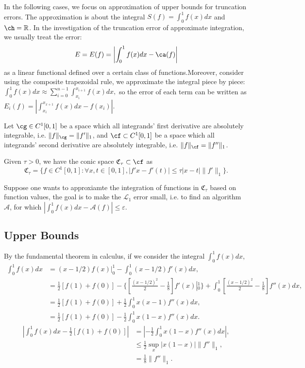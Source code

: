 
\newcommand{\R}{\mathbb{R}}
In the following cases, we focus on approximation of upper bounds for truncation errors. The approximation is about the integral $S(f)=\int_{0}^{1}f(x)dx$ and $\ch=\R$. In the investigation of the truncation error of approximate integration, we usually treat the error:
$$E=E(f)=\left|\int_{0}^{1}f(x)dx-\ca(f)\right|$$
as a linear functional defined over a certain class of functions.Moreover, consider using the composite trapezoidal rule, we approximate the integral piece by piece:
$\int_{0}^{1}f(x)dx\approx\sum_{i=0}^{n-1}\int_{x_{i}}^{x_{i+1}}f(x)dx,$ so the error of each term can be written as $E_i(f)=|\int_{x_{i}}^{x_{x+1}}f(x)dx-f(x_i)|$.

Let $\cg\in C^{1}[0,1]$ be a space which all integrands' first derivative are absolutely integrable, i.e. $\|f\|_{\cg}=\|f'\|_{1}$, and $\cf\subset C^{1}[0,1]$ be a space which all integrands' second derivative are absolutely integrable, i.e. $\|f\|_{\cf}=\|f''\|_{1}$.

Given $\tau > 0$, we have the conic space $\mathfrak{C}_{\tau} \subset \cf$ as $$\mathfrak{C}_{\tau}=\{f\in C^{1}[0,1]:\forall x,t \in[0,1], |f'{x}-f'(t)|\leq\tau|x-t|\|f'\|_1\}.$$

Suppose one wants to approxiamte the integration of functions in $\mathfrak{C}_{\tau}$ based on function values, the goal is to make the $\mathcal{L}_1$ error small, i.e. to find an algorithm $\mathcal{A}$, for which $|\int_{0}^{1}f(x)dx-\mathcal{A}(f)|\leq \varepsilon$.
\subsection{Upper Bounds}
By the fundamental theorem in calculus, if we consider the integral $\int_{0}^{1}f(x)dx$,
\begin{align*}
  \int_{0}^{1}f(x)dx&=(x-1/2)f(x)\left|\right._{0}^{1}-\int_{0}^{1}(x-1/2)f'(x)dx,\\
  &=\frac{1}{2}[f(1)+f(0)]-\{[\frac{(x-1/2)^2}{2}-\frac{1}{8}]f'(x)\left|_{0}^{1}\right.\}+\int_{0}^{1}[\frac{(x-1/2)^2}{2}-\frac{1}{8}]f''(x)dx,\\
  &=\frac{1}{2}[f(1)+f(0)]+\frac{1}{2}\int_{0}^{1}x(x-1)f''(x)dx,\\
  &=\frac{1}{2}[f(1)+f(0)]-\frac{1}{2}\int_{0}^{1}x(1-x)f''(x)dx.
\end{align*}
\begin{align*}
  |\int_{0}^{1}f(x)dx-\frac{1}{2}[f(1)+f(0)]|&=|-\frac{1}{2}\int_{0}^{1}x(1-x)f''(x)dx|,\\
  &\leq\frac{1}{2}\sup_x|x(1-x)|\|f''\|_1,\\
  &=\frac{1}{8}\|f''\|_1.
\end{align*}

